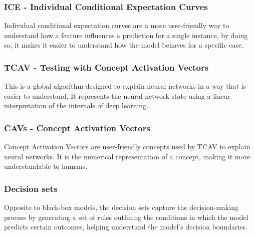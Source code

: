 \documentclass[10pt,journal,compsoc]{IEEEtran}
\begin{document}
\subsubsection{ICE - Individual Conditional Expectation Curves}
Individual conditional expectation curves are a more user-friendly way to understand how a feature influences a prediction for a single instance, by doing so, it makes it easier to understand how the model behaves for a specific case.

\subsubsection{TCAV - Testing with Concept Activation Vectors}
This is a global algorithm designed to explain neural networks in a way that is easier to understand. It represents the neural network state using a linear interpretation of the internals of deep learning.

\subsubsection{CAVs - Concept Activation Vectors}
Concept Activation Vectors are user-friendly concepts used by TCAV to explain neural networks. It is the numerical representation of a concept, making it more understandable to humans.

\subsubsection{Decision sets}
Opposite to black-box models, the decision sets capture the decision-making process by generating a set of rules outlining the conditions in which the model predicts certain outcomes, helping understand the model's decision boundaries.
\end{document}

